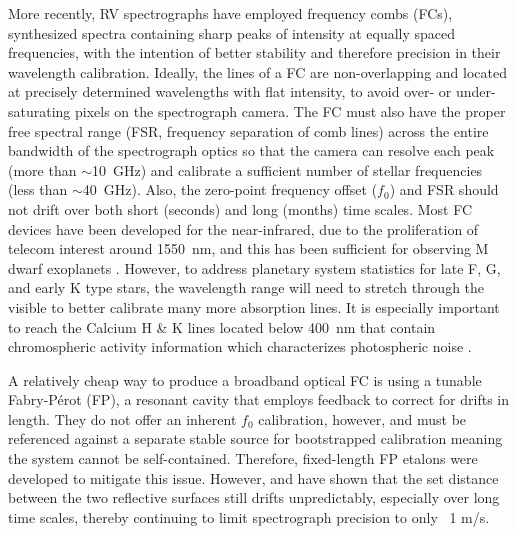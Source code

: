\documentclass[11pt]{article}
\begin{document}
More recently, RV spectrographs have employed frequency combs (FCs), synthesized spectra containing sharp peaks of intensity at equally spaced frequencies, with the intention of better stability and therefore precision in their wavelength calibration. Ideally, the lines of a FC are non-overlapping and located at precisely determined wavelengths with flat intensity, to avoid over- or under-saturating pixels on the spectrograph camera. The FC must also have the proper free spectral range (FSR, frequency separation of comb lines) across the entire bandwidth of the spectrograph optics so that the camera can resolve each peak (more than $\sim$\SI{10}{\giga\hertz}) and calibrate a sufficient number of stellar frequencies (less than $\sim$\SI{40}{\giga\hertz}). Also, the zero-point frequency offset ($f_0$) and FSR should not drift over both short (seconds) and long (months) time scales. Most FC devices have been developed for the near-infrared, due to the proliferation of telecom interest around \SI{1550}{\nano\meter}, and this has been sufficient for observing M dwarf exoplanets \citep{Fischer2016}. However, to address planetary system statistics for late F, G, and early K type stars, the wavelength range will need to stretch through the visible to better calibrate many more absorption lines. It is especially important to reach the Calcium H & K lines located below \SI{400}{\nano\meter} that contain chromospheric activity information which characterizes photospheric noise \citep{Isaacson2010, Lovis2011}.

A relatively cheap way to produce a broadband optical FC is using a tunable Fabry-Pérot (FP), a resonant cavity that employs feedback to correct for drifts in length. They do not offer an inherent $f_0$ calibration, however, and must be referenced against a separate stable source for bootstrapped calibration \citep{McCracken2014, Sturmer2017} meaning the system cannot be self-contained. Therefore, fixed-length FP etalons were developed to mitigate this issue. However, \citet{Reiners2014} and \citet{Wildi2012} have shown that the set distance between the two reflective surfaces still drifts unpredictably, especially over long time scales, thereby continuing to limit spectrograph precision to only ~1 m/s.
\end{document}
